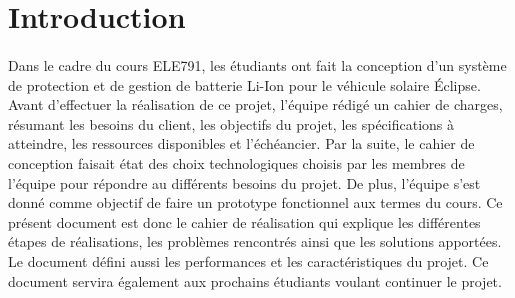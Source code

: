 \section{Introduction}

	\paragraph{}
	Dans le cadre du cours ELE791, les étudiants ont fait la conception d’un système de protection et de gestion de batterie Li-Ion pour le véhicule solaire Éclipse. Avant d’effectuer la réalisation de ce projet, l’équipe rédigé un cahier de charges, résumant les besoins du client, les objectifs du projet, les spécifications à atteindre, les ressources disponibles et l’échéancier. Par la suite, le cahier de conception faisait état des choix technologiques choisis par les membres de l’équipe pour répondre au différents besoins du projet. De plus, l’équipe s’est donné comme objectif de faire un prototype fonctionnel aux termes du cours.
	Ce présent document est donc le cahier de réalisation qui explique les différentes étapes de réalisations, les problèmes rencontrés ainsi que les solutions apportées. Le document défini aussi les performances et les caractéristiques du projet.
	Ce document servira également aux prochains étudiants voulant continuer le projet.
	